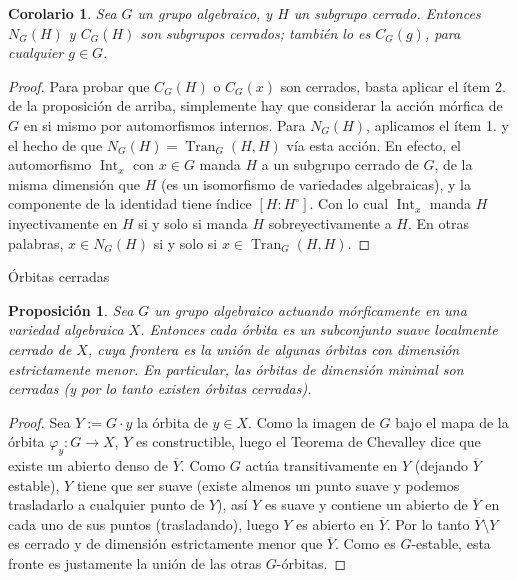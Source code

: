\documentclass[spanish,10pt]{amsart}
\makeatletter
\renewcommand\subsection{\@startsection{subsection}{2}%
  \z@{.5\linespacing\@plus.7\linespacing}{-.5em}%
  {\normalfont\sffamily}}
\newtheorem{corollary}[theorem]{Corolario}
\newtheorem{proposition}[theorem]{Proposición}
\theoremstyle{definition}
\theoremstyle{remark}
\numberwithin{equation}{section}
\renewcommand{\bar}[1]{\overline{#1}}
\makeatother
\begin{document}
\begin{corollary}
Sea $G$ un grupo algebraico, y $H$ un subgrupo cerrado. Entonces $N_G (H)$ y $C_G (H)$ son subgrupos cerrados; también lo es $C_G (g)$, para cualquier $g \in G$.
\end{corollary}
\begin{proof}
Para probar que $C_G (H)$ o $C_G (x)$ son cerrados, basta aplicar el ítem 2. de la proposición de arriba, simplemente hay que considerar la acción mórfica de $G$ en si mismo por automorfismos internos. Para $N_G (H)$, aplicamos el ítem 1. y el hecho de que $N_G (H) = \operatorname{Tran}_G (H,H)$ vía esta acción. En efecto, el automorfismo $\operatorname{Int}_x$ con $x \in G$ manda $H$ a un subgrupo cerrado de $G$, de la misma dimensión que $H$ (es un isomorfismo de variedades algebraicas), y la componente de la identidad tiene índice $[H : H^\circ]$. Con lo cual $\operatorname{Int}_x$ manda $H$ inyectivamente en $H$ si y solo si manda $H$ sobreyectivamente a $H$. En otras palabras, $x \in N_G (H)$ si y solo si $x \in \operatorname {Tran}_G (H, H)$.
\end{proof}



\subsection{Órbitas cerradas}

\begin{proposition}
Sea $G$ un grupo algebraico actuando mórficamente en una variedad algebraica $X$. Entonces cada órbita es un subconjunto suave localmente cerrado de $X$, cuya frontera es la unión de algunas órbitas con dimensión estrictamente menor. En particular, las órbitas de dimensión minimal son cerradas (y por lo tanto existen órbitas cerradas).
\end{proposition}

\begin{proof}
Sea $Y := G \cdot y$ la órbita de $y \in X$. Como la imagen de $G$ bajo el mapa de la órbita $\varphi_y : G \to X$, $Y$ es constructible, luego el Teorema de Chevalley dice que existe un abierto denso de $\bar Y$. Como $G$ actúa transitivamente en $Y$ (dejando $\bar Y$ estable), $Y$ tiene que ser suave (existe almenos un punto suave y podemos trasladarlo a cualquier punto de $Y$), así $Y$ es suave y contiene un abierto de $\bar Y$ en cada uno de sus puntos (trasladando), luego $Y$ es abierto en $\bar Y$. Por lo tanto $\bar Y \setminus Y$ es cerrado y de dimensión estrictamente menor que $\bar Y$. Como es $G$-estable, esta fronte es justamente la unión de las otras $G$-órbitas.
\end{proof}
\end{document}
